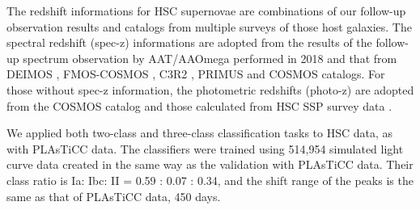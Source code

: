 \documentclass[useamsfonts]{pasj01}
\begin{document}
%
%
\begin{table}[ht]
\label{tab:HSCsurvey_schedule}
\end{table}
%

The redshift informations for HSC supernovae are combinations of our follow-up observation results and catalogs from multiple surveys of those host galaxies.
The spectral redshift (spec-z) informations are adopted from the results of the follow-up spectrum observation by AAT/AAOmega performed in 2018 and that from DEIMOS \citep{DEIMOS2018}, FMOS-COSMOS \citep{FMOS-COSMOS2015}, C3R2 \citep{C3R2_2017}, PRIMUS \citep{PRIMUS2011} and COSMOS catalogs.
For those without spec-z information, the photometric redshifts (photo-z) are adopted from the COSMOS catalog and those calculated from HSC SSP survey data \citep{HSCSSP_photo-z2018}.

We applied both two-class and three-class classification tasks to HSC data, as with PLAsTiCC data.
The classifiers were trained using 514,954 simulated light curve data created in the same way as the validation with PLAsTiCC data.
Their class ratio is Ia: Ibc: II = 0.59 : 0.07 : 0.34, and the shift range of the peaks is the same as that of PLAsTiCC data, 450 days.
%
\end{document}
